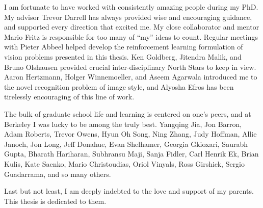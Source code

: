 \begin{acknowledgements}
I am fortunate to have worked with consistently amazing people during my PhD.
My advisor Trevor Darrell has always provided wise and encouraging guidance, and supported every direction that excited me.
My close collaborator and mentor Mario Fritz is responsible for too many of ``my'' ideas to count.
Regular meetings with Pieter Abbeel helped develop the reinforcement learning formulation of vision problems presented in this thesis.
Ken Goldberg, Jitendra Malik, and Bruno Olshausen provided crucial inter-disciplinary North Stars to keep in view.
Aaron Hertzmann, Holger Winnemoeller, and Aseem Agarwala introduced me to the novel recognition problem of image style, and Alyosha Efros has been tirelessly encouraging of this line of work.

The bulk of graduate school life and learning is centered on one's peers, and at Berkeley I was lucky to be among the truly best.
Yangqing Jia, Jon Barron, Adam Roberts, Trevor Owens, Hyun Oh Song, Ning Zhang, Judy Hoffman, Allie Janoch, Jon Long, Jeff Donahue, Evan Shelhamer, Georgia Gkioxari, Saurabh Gupta, Bharath Hariharan, Subhransu Maji, Sanja Fidler, Carl Henrik Ek, Brian Kulis, Kate Saenko, Mario Christoudias, Oriol Vinyals, Ross Girshick, Sergio Guadarrama, and so many others.

Last but not least, I am deeply indebted to the love and support of my parents.
This thesis is dedicated to them.
\end{acknowledgements}
